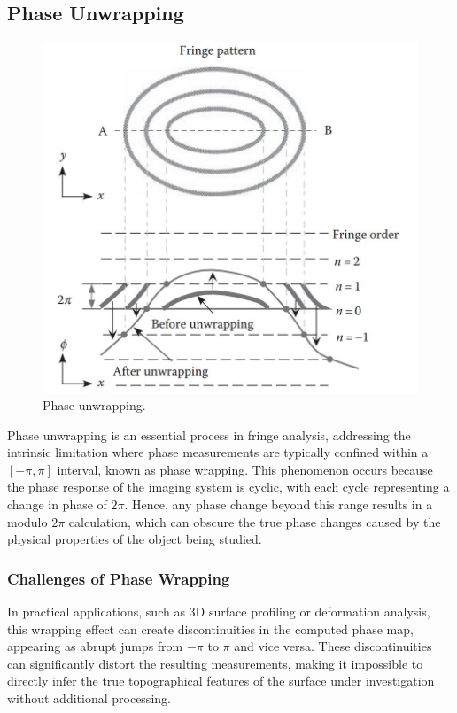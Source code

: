 \documentclass[../main.tex]{subfiles}
\begin{document}
\subsection{Phase Unwrapping}
\vspace{-8pt}
\begin{figure}
    \vspace{-5cm}
    \includegraphics[height=0.5\textwidth]{Images/Introduction/phase_unwrapping}
    \vspace{-8pt}
    \caption{Phase unwrapping.\cite{fringe_analysis}}
    \label{fig:phase_wrapping}
\end{figure}
\begin{minipage}{0.5\textwidth}
Phase unwrapping is an essential process in fringe analysis, addressing the intrinsic limitation where phase measurements are typically confined within a $[-\pi, \pi]$ interval, known as phase wrapping. This phenomenon occurs because the phase response of the imaging system is cyclic, with each cycle representing a change in phase of $2\pi$. Hence, any phase change beyond this range results in a modulo $2\pi$ calculation, which can obscure the true phase changes caused by the physical properties of the object being studied.
\vspace{-10pt}
\subsubsection{Challenges of Phase Wrapping}
\vspace{-4pt}
In practical applications, such as 3D surface profiling or deformation analysis, this wrapping effect can create discontinuities in the computed phase map, appearing as abrupt jumps from $-\pi$ to $\pi$ and vice versa. These discontinuities can significantly distort the resulting measurements, making it impossible to directly infer the true topographical features of the surface under investigation without additional processing.
\end{minipage}
\end{document}
